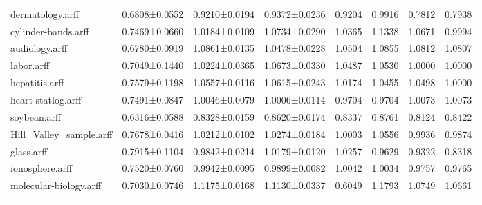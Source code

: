\begin{table*}[h]
\begin{tabular}{llllllll}
dermatology.arff&0.6808±0.0552&0.9210±0.0194&0.9372±0.0236&0.9204&0.9916&0.7812&0.7938\\
cylinder-bands.arff&0.7469±0.0660&1.0184±0.0109&1.0734±0.0290&1.0365&1.1338&1.0671&0.9994\\
audiology.arff&0.6780±0.0919&1.0861±0.0135&1.0478±0.0228&1.0504&1.0855&1.0812&1.0807\\
labor.arff&0.7049±0.1440&1.0224±0.0365&1.0673±0.0330&1.0487&1.0530&1.0000&1.0000\\
hepatitis.arff&0.7579±0.1198&1.0557±0.0116&1.0615±0.0243&1.0174&1.0455&1.0498&1.0000\\
heart-statlog.arff&0.7491±0.0847&1.0046±0.0079&1.0006±0.0114&0.9704&0.9704&1.0073&1.0073\\
soybean.arff&0.6316±0.0588&0.8328±0.0159&0.8620±0.0174&0.8337&0.8761&0.8124&0.8422\\
Hill_Valley_sample.arff&0.7678±0.0416&1.0212±0.0102&1.0274±0.0184&1.0003&1.0556&0.9936&0.9874\\
glass.arff&0.7915±0.1104&0.9842±0.0214&1.0179±0.0120&1.0257&0.9629&0.9322&0.8318\\
ionosphere.arff&0.7520±0.0760&0.9942±0.0095&0.9899±0.0082&1.0042&1.0034&0.9757&0.9765\\
molecular-biology.arff&0.7030±0.0746&1.1175±0.0168&1.1130±0.0337&0.6049&1.1793&1.0749&1.0661\\
\noalign{\smallskip}\hline
\end{tabular}
\end{table*}